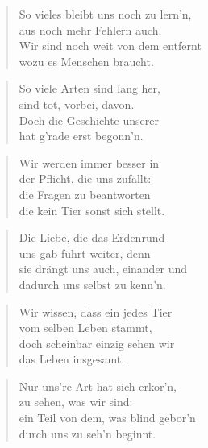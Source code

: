 \documentclass[10pt,a4paper]{article}
\begin{document}
\begin{paracol}{2}
\begin{verse}
So vieles bleibt uns noch zu lern’n, \\
aus noch mehr Fehlern auch. \\
Wir sind noch weit von dem entfernt \\
wozu es Menschen braucht. \\
\end{verse}

\begin{verse}
So viele Arten sind lang her, \\
sind tot, vorbei, davon. \\
Doch die Geschichte unserer \\
hat g’rade erst begonn’n. \\
\end{verse}

\begin{verse}
Wir werden immer besser in \\
der Pflicht, die uns zufällt: \\
die Fragen zu beantworten \\
die kein Tier sonst sich stellt. \\
\end{verse}

\begin{verse}
Die Liebe, die das Erdenrund \\
uns gab führt weiter, denn \\
sie drängt uns auch, einander und \\
dadurch uns selbst zu kenn’n. \\
\end{verse}

\begin{verse}
Wir wissen, dass ein jedes Tier \\
vom selben Leben stammt, \\
doch scheinbar einzig sehen wir \\
das Leben insgesamt. \\
\end{verse}

\begin{verse}
Nur uns’re Art hat sich erkor’n, \\
zu sehen, was wir sind: \\
ein Teil von dem, was blind gebor’n \\
durch uns zu seh’n beginnt. \\
\end{verse}


\end{paracol}
\end{document}
